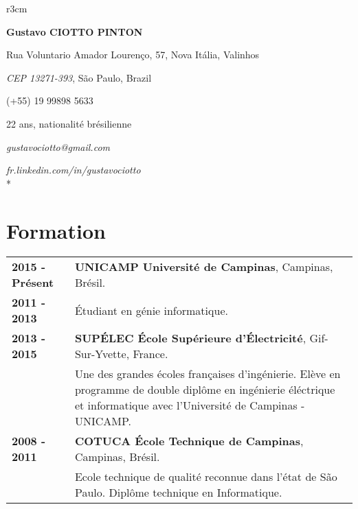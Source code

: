 \documentclass[10pt, a4paper]{article}
\author{Gustavo Ciotto Pinton}
\begin{document}
\pagestyle{empty} 

\begin{wrapfigure}{r}{3cm}
  \vspace{-20pt}
  \begin{center}
  \end{center}
\end{wrapfigure}

\textbf{\LARGE Gustavo CIOTTO PINTON}

Rua Voluntario Amador Lourenço, 57, Nova Itália, Valinhos

\textit{CEP 13271-393}, São Paulo, Brazil

(+55) 19 99898 5633

22 ans, nationalité brésilienne

\textit{gustavociotto@gmail.com} 

\textit{fr.linkedin.com/in/gustavociotto}\\*



\section{Formation}

\begin{tabular}{p{} p{}}

 \textbf{2015 - Présent} & \textbf{UNICAMP Université de Campinas}, Campinas,
 Brésil.
 \\
 \textbf{2011 - 2013} & Étudiant en génie informatique. \vspace{8pt}\\

 \textbf{2013 - 2015} & \textbf{SUPÉLEC  École Supérieure d'Électricité},
 Gif-Sur-Yvette, France. \\
 & Une des grandes écoles françaises d'ingénierie. Elève en programme de double
 diplôme en ingénierie éléctrique et informatique avec l'Université de Campinas
 - UNICAMP. \vspace{8pt}
 \\
  
 
 \textbf{2008 - 2011} & \textbf{COTUCA École Technique de Campinas}, Campinas, Brésil. \\ 
 & Ecole technique de qualité reconnue dans l’état de São Paulo. Diplôme
 technique en Informatique. \\
\end{tabular}
\end{document}
